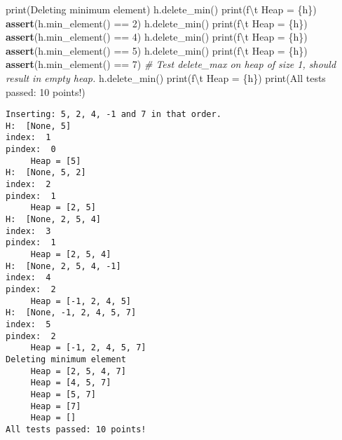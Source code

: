 \documentclass[
]{article}
\newenvironment{Shaded}{}{}
\newcommand{\BuiltInTok}[1]{\textcolor[rgb]{0.00,0.50,0.00}{#1}}
\newcommand{\CharTok}[1]{\textcolor[rgb]{0.25,0.44,0.63}{#1}}
\newcommand{\CommentTok}[1]{\textcolor[rgb]{0.38,0.63,0.69}{\textit{#1}}}
\newcommand{\ControlFlowTok}[1]{\textcolor[rgb]{0.00,0.44,0.13}{\textbf{#1}}}
\newcommand{\DecValTok}[1]{\textcolor[rgb]{0.25,0.63,0.44}{#1}}
\newcommand{\NormalTok}[1]{#1}
\newcommand{\OperatorTok}[1]{\textcolor[rgb]{0.40,0.40,0.40}{#1}}
\newcommand{\SpecialCharTok}[1]{\textcolor[rgb]{0.25,0.44,0.63}{#1}}
\newcommand{\SpecialStringTok}[1]{\textcolor[rgb]{0.73,0.40,0.53}{#1}}
\newcommand{\StringTok}[1]{\textcolor[rgb]{0.25,0.44,0.63}{#1}}
\begin{document}
\begin{Shaded}
\begin{Highlighting}[]
\BuiltInTok{print}\NormalTok{(}\StringTok{\textquotesingle{}Deleting minimum element\textquotesingle{}}\NormalTok{)}
\NormalTok{h.delete\_min()}
\BuiltInTok{print}\NormalTok{(}\SpecialStringTok{f\textquotesingle{}}\CharTok{\textbackslash{}t}\SpecialStringTok{ Heap = }\SpecialCharTok{\{}\NormalTok{h}\SpecialCharTok{\}}\SpecialStringTok{\textquotesingle{}}\NormalTok{)}
\ControlFlowTok{assert}\NormalTok{(h.min\_element() }\OperatorTok{==} \DecValTok{2}\NormalTok{)}
\NormalTok{h.delete\_min()}
\BuiltInTok{print}\NormalTok{(}\SpecialStringTok{f\textquotesingle{}}\CharTok{\textbackslash{}t}\SpecialStringTok{ Heap = }\SpecialCharTok{\{}\NormalTok{h}\SpecialCharTok{\}}\SpecialStringTok{\textquotesingle{}}\NormalTok{)}
\ControlFlowTok{assert}\NormalTok{(h.min\_element() }\OperatorTok{==} \DecValTok{4}\NormalTok{)}
\NormalTok{h.delete\_min()}
\BuiltInTok{print}\NormalTok{(}\SpecialStringTok{f\textquotesingle{}}\CharTok{\textbackslash{}t}\SpecialStringTok{ Heap = }\SpecialCharTok{\{}\NormalTok{h}\SpecialCharTok{\}}\SpecialStringTok{\textquotesingle{}}\NormalTok{)}
\ControlFlowTok{assert}\NormalTok{(h.min\_element() }\OperatorTok{==} \DecValTok{5}\NormalTok{)}
\NormalTok{h.delete\_min()}
\BuiltInTok{print}\NormalTok{(}\SpecialStringTok{f\textquotesingle{}}\CharTok{\textbackslash{}t}\SpecialStringTok{ Heap = }\SpecialCharTok{\{}\NormalTok{h}\SpecialCharTok{\}}\SpecialStringTok{\textquotesingle{}}\NormalTok{)}
\ControlFlowTok{assert}\NormalTok{(h.min\_element() }\OperatorTok{==} \DecValTok{7}\NormalTok{)}
\CommentTok{\# Test delete\_max on heap of size 1, should result in empty heap.}
\NormalTok{h.delete\_min()}
\BuiltInTok{print}\NormalTok{(}\SpecialStringTok{f\textquotesingle{}}\CharTok{\textbackslash{}t}\SpecialStringTok{ Heap = }\SpecialCharTok{\{}\NormalTok{h}\SpecialCharTok{\}}\SpecialStringTok{\textquotesingle{}}\NormalTok{)}
\BuiltInTok{print}\NormalTok{(}\StringTok{\textquotesingle{}All tests passed: 10 points!\textquotesingle{}}\NormalTok{)}
\end{Highlighting}
\end{Shaded}

\begin{verbatim}
Inserting: 5, 2, 4, -1 and 7 in that order.
H:  [None, 5]
index:  1
pindex:  0
	 Heap = [5]
H:  [None, 5, 2]
index:  2
pindex:  1
	 Heap = [2, 5]
H:  [None, 2, 5, 4]
index:  3
pindex:  1
	 Heap = [2, 5, 4]
H:  [None, 2, 5, 4, -1]
index:  4
pindex:  2
	 Heap = [-1, 2, 4, 5]
H:  [None, -1, 2, 4, 5, 7]
index:  5
pindex:  2
	 Heap = [-1, 2, 4, 5, 7]
Deleting minimum element
	 Heap = [2, 5, 4, 7]
	 Heap = [4, 5, 7]
	 Heap = [5, 7]
	 Heap = [7]
	 Heap = []
All tests passed: 10 points!
\end{verbatim}
\end{document}
